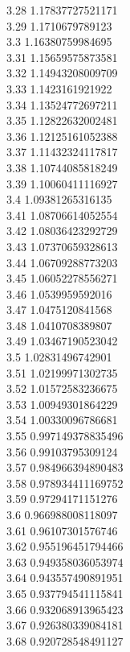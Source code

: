 {3.28	1.17837727521171\\
3.29	1.1710679789123\\
3.3	1.16380759984695\\
3.31	1.15659575873581\\
3.32	1.14943208009709\\
3.33	1.1423161921922\\
3.34	1.13524772697211\\
3.35	1.12822632002481\\
3.36	1.12125161052388\\
3.37	1.11432324117817\\
3.38	1.10744085818249\\
3.39	1.10060411116927\\
3.4	1.09381265316135\\
3.41	1.08706614052554\\
3.42	1.08036423292729\\
3.43	1.07370659328613\\
3.44	1.06709288773203\\
3.45	1.06052278556271\\
3.46	1.0539959592016\\
3.47	1.0475120841568\\
3.48	1.0410708389807\\
3.49	1.03467190523042\\
3.5	1.02831496742901\\
3.51	1.02199971302735\\
3.52	1.01572583236675\\
3.53	1.00949301864229\\
3.54	1.00330096786681\\
3.55	0.997149378835496\\
3.56	0.99103795309124\\
3.57	0.984966394890483\\
3.58	0.978934411169752\\
3.59	0.97294171151276\\
3.6	0.966988008118097\\
3.61	0.96107301576746\\
3.62	0.955196451794466\\
3.63	0.949358036053974\\
3.64	0.943557490891951\\
3.65	0.937794541115841\\
3.66	0.932068913965423\\
3.67	0.926380339084181\\
3.68	0.920728548491127\\
}
